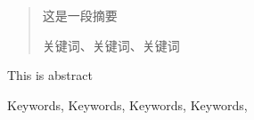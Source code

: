 \begin{abstract}
	
这是一段摘要

	\begin{keywords}
		关键词、关键词、关键词
	\end{keywords}
\end{abstract}

\begin{Abstract}
	
	This is abstract
	

	
	
	\begin{Keywords}
		Keywords, Keywords, Keywords, Keywords,
	\end{Keywords}
\end{Abstract}